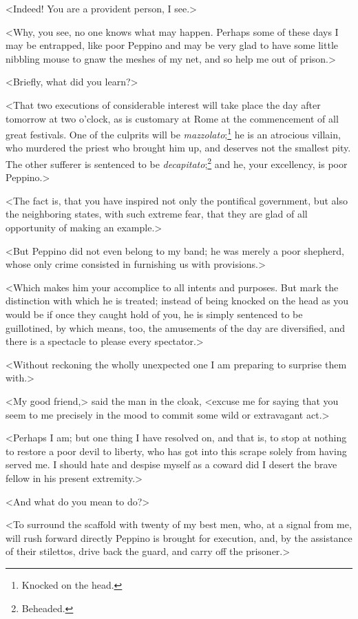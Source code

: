  <Indeed! You are a provident person, I see.> 

 <Why, you see, no one knows what may happen. Perhaps some of these days I may be entrapped, like poor Peppino and may be very glad to have some little nibbling mouse to gnaw the meshes of my net, and so help me out of prison.> 

 <Briefly, what did you learn?> 

 <That two executions of considerable interest will take place the day after tomorrow at two o'clock, as is customary at Rome at the commencement of all great festivals. One of the culprits will be \textit{mazzolato};\footnote{Knocked on the head.} he is an atrocious villain, who murdered the priest who brought him up, and deserves not the smallest pity. The other sufferer is sentenced to be \textit{decapitato};\footnote{Beheaded.} and he, your excellency, is poor Peppino.> 

 <The fact is, that you have inspired not only the pontifical government, but also the neighboring states, with such extreme fear, that they are glad of all opportunity of making an example.> 

 <But Peppino did not even belong to my band; he was merely a poor shepherd, whose only crime consisted in furnishing us with provisions.> 

 <Which makes him your accomplice to all intents and purposes. But mark the distinction with which he is treated; instead of being knocked on the head as you would be if once they caught hold of you, he is simply sentenced to be guillotined, by which means, too, the amusements of the day are diversified, and there is a spectacle to please every spectator.> 

 <Without reckoning the wholly unexpected one I am preparing to surprise them with.> 

 <My good friend,> said the man in the cloak, <excuse me for saying that you seem to me precisely in the mood to commit some wild or extravagant act.> 

 <Perhaps I am; but one thing I have resolved on, and that is, to stop at nothing to restore a poor devil to liberty, who has got into this scrape solely from having served me. I should hate and despise myself as a coward did I desert the brave fellow in his present extremity.> 

 <And what do you mean to do?> 

 <To surround the scaffold with twenty of my best men, who, at a signal from me, will rush forward directly Peppino is brought for execution, and, by the assistance of their stilettos, drive back the guard, and carry off the prisoner.> 

